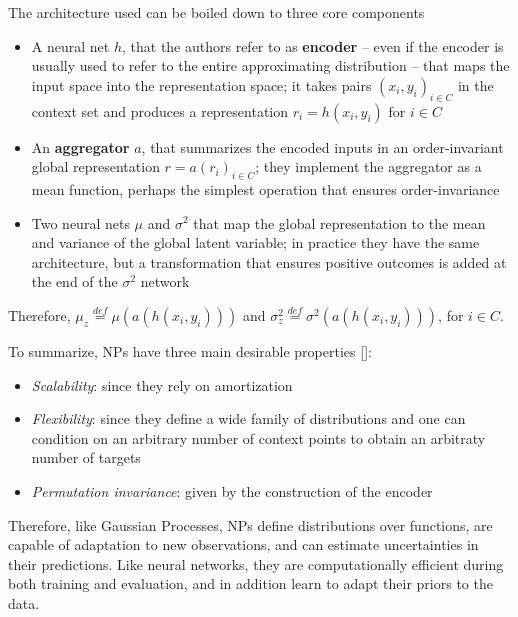 The architecture used can be boiled down to three core components
\begin{itemize}
    \item A neural net $h$, that the authors refer to as \textbf{encoder} -- even if the encoder is usually used to refer to the entire approximating distribution -- that maps the input space into the representation space; it takes pairs $(x_i, y_i)_{i\in C}$ in the context set and produces a representation $r_i = h(x_i, y_i)$ for $i\in C$
    \item An \textbf{aggregator} $a$, that summarizes the encoded inputs in an order-invariant global representation $r = a(r_i)_{i\in C}$; they implement the aggregator as a mean function, perhaps the simplest operation that ensures order-invariance
    \item Two neural nets $\mu$ and $\sigma^2$ that map the global representation to the mean and variance of the global latent variable; in practice they have the same architecture, but a transformation that ensures positive outcomes is added at the end of the $\sigma^2$ network 
\end{itemize}
Therefore, $\mu_z \stackrel{\scriptscriptstyle def}{=} \mu(a(h(x_i, y_i)))$ and $\sigma^2_z \stackrel{\scriptscriptstyle def}{=} \sigma^2(a(h(x_i, y_i)))$, for $i\in C$.

\bigbreak 

To summarize, NPs have three main desirable properties [\cite{Garnelo2018a}]: 
\begin{itemize}
    \item \textit{Scalability}: since they rely on amortization
    \item \textit{Flexibility}: since they define a wide family of distributions and one can condition on an arbitrary number of context points to obtain an arbitraty number of targets
    \item \textit{Permutation invariance}: given by the construction of the encoder
\end{itemize}
Therefore, like Gaussian Processes, NPs define distributions over functions, are capable of adaptation to new observations, and can estimate uncertainties in their predictions. Like neural networks, they are computationally efficient during both training and evaluation, and in addition learn to adapt their priors to the data.


